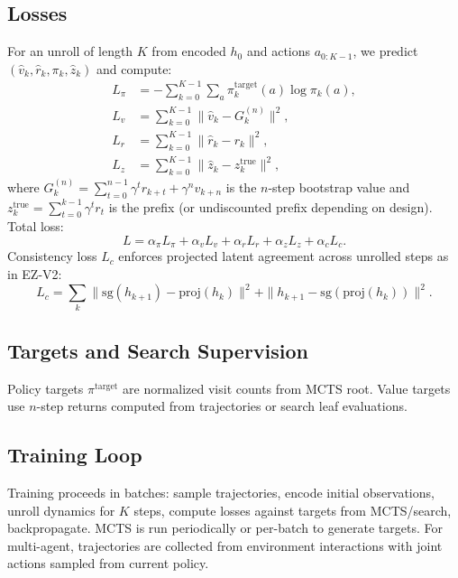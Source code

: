 \documentclass[10pt]{article}
\begin{document}
\subsection{Losses}
For an unroll of length $K$ from encoded $h_0$ and actions $a_{0:K-1}$, we predict $(\hat v_k,\hat r_k,\pi_k,\hat z_k)$ and compute:
\begin{align}
L_\pi &= -\sum_{k=0}^{K-1}\sum_a \pi^{\text{target}}_k(a)\log \pi_k(a),\\
L_v &= \sum_{k=0}^{K-1} \|\hat v_k - G_k^{(n)}\|^2,\\
L_r &= \sum_{k=0}^{K-1} \|\hat r_k - r_k\|^2,\\
L_z &= \sum_{k=0}^{K-1} \|\hat z_k - z^{\text{true}}_k\|^2,
\end{align}
where $G_k^{(n)}=\sum_{t=0}^{n-1}\gamma^t r_{k+t}+\gamma^n v_{k+n}$ is the $n$-step bootstrap value and $z^{\text{true}}_k=\sum_{t=0}^{k-1}\gamma^t r_t$ is the prefix (or undiscounted prefix depending on design).
Total loss:
\begin{equation}
L = \alpha_\pi L_\pi + \alpha_v L_v + \alpha_r L_r + \alpha_z L_z + \alpha_c L_c .
\end{equation}
Consistency loss $L_c$ enforces projected latent agreement across unrolled steps as in EZ-V2:
\begin{equation}
L_c = \sum_{k}\|\mathrm{sg}(h_{k+1}) - \mathrm{proj}(h_k)\|^2 + \|h_{k+1} - \mathrm{sg}(\mathrm{proj}(h_k))\|^2.
\end{equation}

\subsection{Targets and Search Supervision}
Policy targets $\pi^{\text{target}}$ are normalized visit counts from MCTS root. Value targets use $n$-step returns computed from trajectories or search leaf evaluations.

\subsection{Training Loop}
Training proceeds in batches: sample trajectories, encode initial observations, unroll dynamics for $K$ steps, compute losses against targets from MCTS/search, backpropagate. MCTS is run periodically or per-batch to generate targets. For multi-agent, trajectories are collected from environment interactions with joint actions sampled from current policy.
\end{document}
